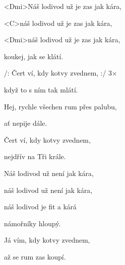 

\zs
<Dmi>Náš lodivod už je zas jak kára,

<C>náš lodivod už je zas jak kára,

<Dmi>náš lodivod už je zas jak kára,

koukej, jak se klátí.
\ks

\zr
/: Čert ví, kdy kotvy zvednem, :/ 3$\times$

když to s ním tak mlátí.
\kr

\zs
Hej, rychle všechen rum přes palubu,

ať nepije dále.
\ks

\zr
Čert ví, kdy kotvy zvednem,

nejdřív na Tři krále.
\kr

\zs
Náš lodivod už není jak kára,

náš lodivod už není jak kára,

náš lodivod je fit a kárá

námořníky hloupý.
\ks

\zr
Já vím, kdy kotvy zvednem,

až se rum zas koupí.
\kr

\kp

